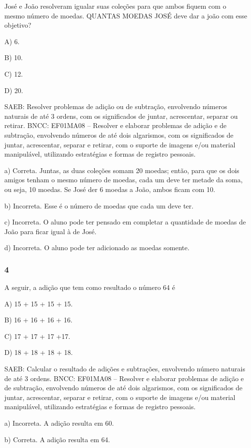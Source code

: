 José e João resolveram igualar suas coleções para que ambos fiquem com o mesmo número de moedas. QUANTAS MOEDAS JOSÉ deve dar a joão com esse objetivo?

A) 6.

B) 10.

C) 12.

D) 20.

SAEB: Resolver problemas de adição ou de subtração, envolvendo
números naturais de até 3 ordens, com os significados de juntar,
acrescentar, separar ou retirar.
BNCC: EF01MA08 -- Resolver e elaborar problemas de adição e de subtração,
envolvendo números de até dois algarismos, com os significados de
juntar, acrescentar, separar e retirar, com o suporte de imagens e/ou
material manipulável, utilizando estratégias e formas de registro
pessoais.

a) Correta. Juntas, as duas coleções somam 20 moedas; então, para que os dois amigos tenham o mesmo número de moedas, cada um deve ter metade da soma, ou seja, 10 moedas. Se José der 6 moedas a João, ambos ficam com 10.

b) Incorreta. Esse é o número de moedas que cada um deve ter.

c) Incorreta. O aluno pode ter pensado em completar a quantidade de
moedas de João para ficar igual à de José.

d) Incorreta. O aluno pode ter adicionado as moedas somente.

\subsubsection{4}\label{section-105}

A seguir, a adição que tem como resultado o número 64 é

A) 15 + 15 + 15 + 15.

B) 16 + 16 + 16 + 16.

C) 17 + 17 + 17 +17.

D) 18 + 18 + 18 + 18.

SAEB: Calcular o resultado de adições e subtrações, envolvendo
número naturais de até 3 ordens.
BNCC: EF01MA08 -- Resolver e elaborar problemas de adição e de subtração,
envolvendo números de até dois algarismos, com os significados de
juntar, acrescentar, separar e retirar, com o suporte de imagens e/ou
material manipulável, utilizando estratégias e formas de registro
pessoais.

a) Incorreta. A adição resulta em 60.

b) Correta. A adição resulta em 64.

